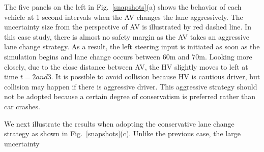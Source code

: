 \documentclass[10pt,journal]{IEEEtran}
\begin{document}
	The five panels on the left in Fig.~\ref{snapshots}(a) shows the behavior of each vehicle at 1 second intervals when the AV changes the lane aggressively. The uncertainty size from the perspective of AV is illustrated by red dashed line. In this case study, there is almost no safety margin as the AV takes an aggressive lane change strategy. As a result, the left steering input is initiated as soon as the simulation begins and lane change occurs between 60m and 70m. Looking more closely, due to the close distance between AV, the HV slightly moves to left at time $t=2 and 3$. It is possible to avoid collision because HV is cautious driver, but collision may happen if there is aggressive driver. This aggressive strategy should not be adopted because a certain degree of conservatism is preferred rather than car crashes.
	
	We next illustrate the results when adopting the conservative lane change strategy as shown in Fig.~\ref{snapshots}(c). Unlike the previous case, the large uncertainty 
	
\end{document}
